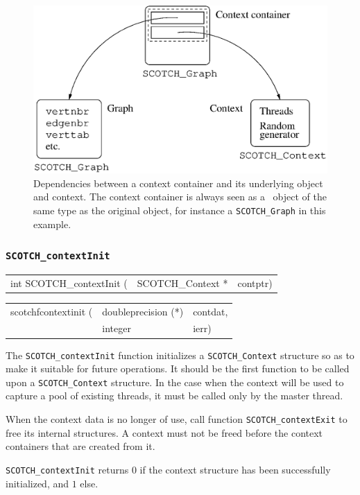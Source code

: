 \begin{figure}[hbt]
\centering\includegraphics[scale=0.47]{s_f_cnt.eps}
\caption{Dependencies between a context container and its underlying
  object and context. The context container is always seen as a
  \scotch\ object of the same type as the original object, for
  instance a \texttt{SCOTCH\_\protect\lbt Graph} in this example.}
\label{fig-lib-context}
\end{figure}

\subsubsection{\texttt{SCOTCH\_contextInit}}

\begin{itemize}
\progsyn

{\tt\begin{tabular}{l@{}ll}
int SCOTCH\_contextInit ( & SCOTCH\_Context * & contptr)
\end{tabular}}

{\tt\begin{tabular}{l@{}ll}
scotchfcontextinit ( & doubleprecision (*) & contdat, \\
                     & integer             & ierr)
\end{tabular}}

\progdes

The \texttt{SCOTCH\_contextInit} function initializes a
\texttt{SCOTCH\_\lbt Context} structure so as to make it suitable for
future operations. It should be the first function to be called upon
a \texttt{SCOTCH\_\lbt Context} structure. In the case when the
context will be used to capture a pool of existing threads, it must be
called only by the master thread.

When the context data is no longer of use, call function
\texttt{SCOTCH\_\lbt contextExit} to free its internal structures.
A context must not be freed before the context containers that are
created from it.

\progret

\texttt{SCOTCH\_contextInit} returns $0$ if the context structure has
been successfully initialized, and $1$ else.
\end{itemize}

